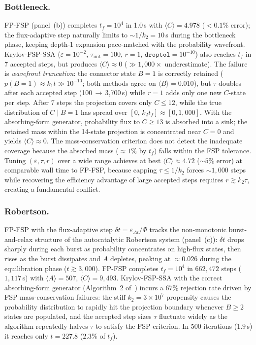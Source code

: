 \documentclass[onefignum,onetabnum]{siamart171218}
\begin{document}
\subsubsection{Bottleneck.}
FP-FSP (panel~(b)) completes $t_f = 10^4$ in 1.0\,s with $\langle C \rangle = 4.978$ (${<}0.1\%$ error); the flux-adaptive step naturally limits to $\sim 1/k_2 = 10$\,s during the bottleneck phase, keeping depth-1 expansion pace-matched with the probability wavefront. Krylov-FSP-SSA ($\varepsilon=10^{-2}$, $\tau_{\mathrm{init}}=100$, $r=1$, $\mathtt{droptol}=10^{-10}$) also reaches $t_f$ in 7 accepted steps, but produces $\langle C \rangle \approx 0$ (${\gg}1{,}000\times$ underestimate). The failure is \emph{wavefront truncation}: the connector state $B{=}1$ is correctly retained ($p(B{=}1) \approx k_1 t \gg 10^{-10}$; both methods agree on $\langle B \rangle = 0.010$), but $\tau$ doubles after each accepted step (100\,$\to$\,3{,}700\,s) while $r=1$ adds only one new $C$-state per step. After 7 steps the projection covers only $C \leq 12$, while the true distribution of $C\mid B{=}1$ has spread over $[0,\,k_2 t_f] \approx [0, 1{,}000]$. With the absorbing-form generator, probability flux to $C \geq 13$ is absorbed into a sink; the retained mass within the 14-state projection is concentrated near $C{=}0$ and yields $\langle C \rangle \approx 0$. The mass-conservation criterion does not detect the inadequate coverage because the absorbed mass (${\approx}1\%$ by $t_f$) falls within the FSP tolerance. Tuning $(\varepsilon, \tau, r)$ over a wide range achieves at best $\langle C \rangle \approx 4.72$ (${\sim}5\%$ error) at comparable wall time to FP-FSP, because capping $\tau \leq 1/k_2$ forces ${\sim}1{,}000$ steps while recovering the efficiency advantage of large accepted steps requires $r \gtrsim k_2 \tau$, creating a fundamental conflict.

\subsubsection{Robertson.}
FP-FSP with the flux-adaptive step $\delta t = \varepsilon_{\Delta t}/\Phi$ tracks the non-monotonic burst-and-relax structure of the autocatalytic Robertson system (panel~(c)): $\delta t$ drops sharply during each burst as probability concentrates on high-flux states, then rises as the burst dissipates and $A$ depletes, peaking at $\approx 0.026$ during the equilibration phase ($t \gtrsim 3{,}000$). FP-FSP completes $t_f = 10^4$ in $662{,}472$ steps ($1{,}117$\,s) with $\langle A \rangle = 507$, $\langle C \rangle = 9{,}493$. Krylov-FSP-SSA with the correct absorbing-form generator (Algorithm~2 of~\cite{Vo2017}) incurs a 67\% rejection rate driven by FSP mass-conservation failures: the stiff $k_2 = 3{\times}10^7$ propensity causes the probability distribution to rapidly hit the projection boundary whenever $B{\geq}2$ states are populated, and the accepted step sizes $\tau$ fluctuate widely as the algorithm repeatedly halves $\tau$ to satisfy the FSP criterion. In 500 iterations ($1.9$\,s) it reaches only $t = 227.8$ ($2.3\%$ of $t_f$).
\end{document}
